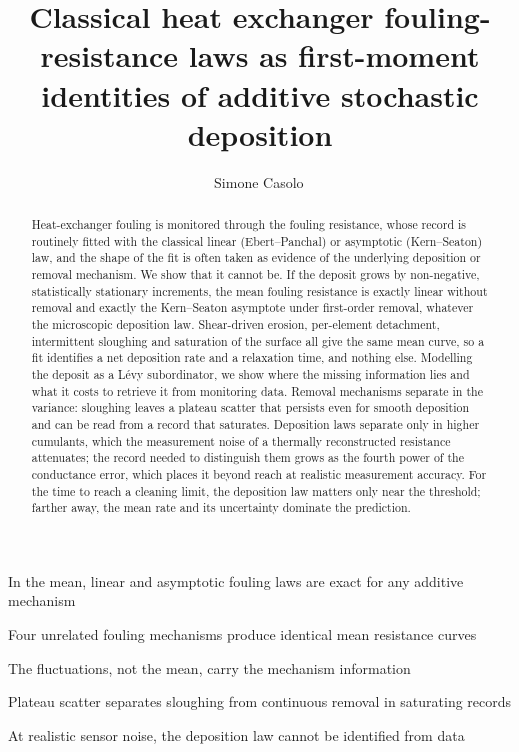 \documentclass[preprint,12pt]{elsarticle}
\begin{document}
\begin{frontmatter}

\title{Classical heat exchanger fouling-resistance laws as first-moment identities of additive stochastic deposition}

\author[cog]{Simone Casolo\,}

\begin{abstract}
Heat-exchanger fouling is monitored through the fouling resistance, whose
record is routinely fitted with the classical linear (Ebert--Panchal) or asymptotic
(Kern--Seaton) law, and the shape of the fit is often taken as evidence of the
underlying deposition or removal mechanism. We show that it cannot be. If the
deposit grows by non-negative, statistically stationary increments, the mean
fouling resistance is exactly linear without removal and exactly the
Kern--Seaton asymptote under first-order removal, whatever the microscopic
deposition law. Shear-driven erosion, per-element detachment, intermittent
sloughing and saturation of the surface all give the same mean curve, so a fit
identifies a net deposition rate and a relaxation time, and nothing else.
Modelling the deposit as a L\'evy subordinator, we show where the missing
information lies and what it costs to retrieve it from monitoring data.
Removal mechanisms separate in the variance: sloughing leaves a plateau
scatter that persists even for smooth deposition and can be read from a
record that saturates. Deposition laws separate only in higher cumulants,
which the measurement noise of a thermally reconstructed resistance
attenuates; the record needed to distinguish them grows as the fourth power
of the conductance error, which places it beyond reach at realistic
measurement accuracy. For the time to reach a cleaning limit, the deposition
law matters only near the threshold; farther away, the mean rate and its
uncertainty dominate the prediction.
\end{abstract}

\begin{highlights}
\item In the mean, linear and asymptotic fouling laws are exact for any additive mechanism
\item Four unrelated fouling mechanisms produce identical mean resistance curves
\item The fluctuations, not the mean, carry the mechanism information
\item Plateau scatter separates sloughing from continuous removal in saturating records
\item At realistic sensor noise, the deposition law cannot be identified from data
\end{highlights}


\end{frontmatter}
\end{document}
